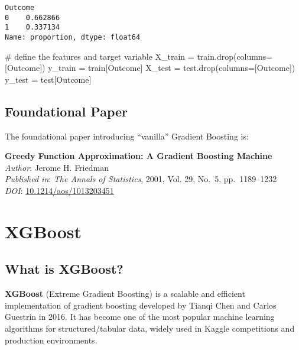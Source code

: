\documentclass[
  letterpaper,
  DIV=11,
  numbers=noendperiod]{scrreprt}
\newenvironment{Shaded}{\begin{snugshade}}{\end{snugshade}}
\newcommand{\CommentTok}[1]{\textcolor[rgb]{0.37,0.37,0.37}{#1}}
\newcommand{\NormalTok}[1]{\textcolor[rgb]{0.00,0.23,0.31}{#1}}
\newcommand{\OperatorTok}[1]{\textcolor[rgb]{0.37,0.37,0.37}{#1}}
\newcommand{\StringTok}[1]{\textcolor[rgb]{0.13,0.47,0.30}{#1}}
\begin{document}
\begin{verbatim}
Outcome
0    0.662866
1    0.337134
Name: proportion, dtype: float64
\end{verbatim}

\begin{Shaded}
\begin{Highlighting}[]
\CommentTok{\# define the features and target variable}
\NormalTok{X\_train }\OperatorTok{=}\NormalTok{ train.drop(columns}\OperatorTok{=}\NormalTok{[}\StringTok{\textquotesingle{}Outcome\textquotesingle{}}\NormalTok{])}
\NormalTok{y\_train }\OperatorTok{=}\NormalTok{ train[}\StringTok{\textquotesingle{}Outcome\textquotesingle{}}\NormalTok{]}
\NormalTok{X\_test }\OperatorTok{=}\NormalTok{ test.drop(columns}\OperatorTok{=}\NormalTok{[}\StringTok{\textquotesingle{}Outcome\textquotesingle{}}\NormalTok{])}
\NormalTok{y\_test }\OperatorTok{=}\NormalTok{ test[}\StringTok{\textquotesingle{}Outcome\textquotesingle{}}\NormalTok{]}
\end{Highlighting}
\end{Shaded}

\section{Foundational Paper}\label{foundational-paper}

The foundational paper introducing ``vanilla'' Gradient Boosting is:

\textbf{Greedy Function Approximation: A Gradient Boosting Machine}\\
\emph{Author}: Jerome H. Friedman\\
\emph{Published in}: \emph{The Annals of Statistics}, 2001, Vol. 29,
No.~5, pp.~1189--1232\\
\emph{DOI}:
\href{https://doi.org/10.1214/aos/1013203451}{10.1214/aos/1013203451}

\chapter{XGBoost}\label{xgboost}

\section{What is XGBoost?}\label{what-is-xgboost}

\textbf{XGBoost} (Extreme Gradient Boosting) is a scalable and efficient
implementation of gradient boosting developed by Tianqi Chen and Carlos
Guestrin in 2016. It has become one of the most popular machine learning
algorithms for structured/tabular data, widely used in Kaggle
competitions and production environments.
\end{document}
